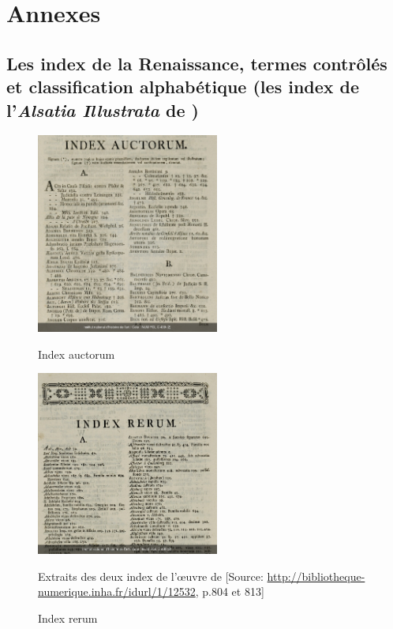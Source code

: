 \appendix
	\part*{Annexes}	
	\setcounter{chapter}{0}

\chapter{\label{annexe_index_schoepflin}Les index de la Renaissance, termes contrôlés et classification alphabétique (les index de l'\textit{Alsatia Illustrata} de )}

\begin{figure}[!h]
	\centering
	\begin{minipage}[c]{.46\linewidth}
		\includegraphics[width=6cm]{images/index_auctorum_alsatia.jpg}
		\caption{Index auctorum}
	\end{minipage} \hfill
	\begin{minipage}[c]{.46\linewidth}
		\includegraphics[width=6cm]{images/index_rerum_alsatia.jpg}
		\caption{Index rerum}
	\end{minipage} 
	\medskip
	Extraits des deux index de l'œuvre de  [Source: \url{http://bibliotheque-numerique.inha.fr/idurl/1/12532}, p.804 et 813]
\end{figure}


